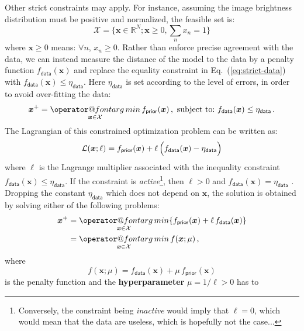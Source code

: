 \documentclass{article}
\makeatletter
\newcommand{\vocab}[1]{\textbf{#1}}
\newcommand{\MathFuncWithLimits}[1]{\mathop{\operator@font #1}\limits}
\newcommand{\Tag}[1]{\mathsf{#1}}        %
\newcommand{\V}[1]{\boldsymbol{#1}}      %
\newcommand{\argmin}{\MathFuncWithLimits{arg\,min}}
\newcommand{\Reals}{\mathbb{R}}
\newcommand{\Eq}[1]{Eq.~(\ref{#1})}
\newcommand{\Param}{x}
\newcommand{\VParam}{\V{\Param}}
\newcommand{\FeasibleSet}{\mathcal{X}}
\newcommand{\DataTag}{\Tag{data}}
\newcommand{\PriorTag}{\Tag{prior}}
\newcommand{\DataLevel}{\eta_\DataTag}
\newcommand{\Fcost}{f}
\newcommand{\Fdata}{\Fcost_\DataTag}
\newcommand{\Fprior}{\Fcost_\PriorTag}
\makeatother
\begin{document}
Other strict constraints may apply.  For instance, assuming the image
brightness distribution must be positive and normalized, the feasible set is:
\begin{equation}
  \label{eq:feasible-set}
  \FeasibleSet =
  \{\VParam\in\Reals^N; \V{\Param} \ge 0, \sum_n \Param_n = 1\}
\end{equation}
where $\V{\Param} \ge 0$ means: $\forall n$, $\Param_n \ge 0$.  Rather than
enforce precise agreement with the data, we can instead measure the distance
of the model to the data by a penalty function $\Fdata(\VParam)$ and replace
the equality constraint in \Eq{eq:strict-data} with $\Fdata(\V{x}) \le
\DataLevel$. Here $\DataLevel$ is set according to the level of errors, in
order to avoid over-fitting the data:
\begin{equation}
  \label{eq:min-prior-st-data-const}
  \VParam^{+} = \argmin_{\VParam\in\FeasibleSet} \Fprior(\VParam)
  \,,\ \text{subject to:\ }
  \Fdata(\VParam) \le \DataLevel \, .
\end{equation}
The Lagrangian of this constrained optimization problem can be written as:
\begin{equation}
  \mathcal{L}(\VParam; \ell) = \Fprior(\VParam)
  + \ell\,\Bigl(\Fdata(\VParam) - \DataLevel\Bigr)
\end{equation}
where $\ell$ is the Lagrange multiplier associated with the inequality
constraint $\Fdata(\VParam)\le\DataLevel$.  If the constraint is
\emph{active}\footnote{Conversely, the constraint being \emph{inactive} would
  imply that $\ell=0$, which would mean that the data are useless, which is
  hopefully not the case...}, then $\ell>0$ and $\Fdata(\VParam)=\DataLevel$
\citep{Nocedal_Wright-2006-numerical_optimization}.  Dropping the constant
$\DataLevel$ which does not depend on $\VParam$, the solution is obtained by
solving either of the following problems:
\begin{align}
  \VParam^{+}
  &= \argmin_{\VParam\in\FeasibleSet}
     \{\Fprior(\VParam) + \ell\,\Fdata(\VParam)\} \notag \\
  &= \argmin_{\VParam\in\FeasibleSet}
     \Fcost(\VParam; \mu) \, , \notag
\end{align}
where 
\begin{equation}
  \label{eq:cost-function}
  \Fcost(\VParam; \mu) = \Fdata(\VParam) + \mu \, \Fprior(\VParam)
\end{equation}
is the penalty function and the \vocab{hyperparameter} $\mu=1/\ell>0$ has to
\end{document}
